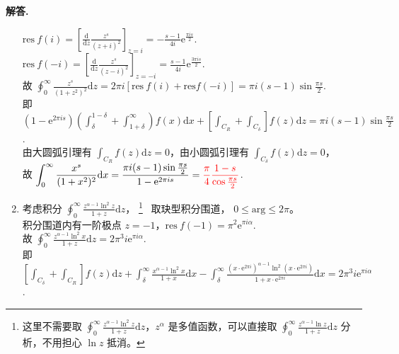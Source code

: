 \documentclass[11pt]{ctexart}
\newenvironment{solution}{\par\noindent\textbf{解答. }}{\par}
\begin{document}
\begin{solution}
\begin{enumerate}[(1)]
              $\displaystyle\text{res}\ f(i) = \left[\frac{\text{d}}{\text{d}z}\frac{z^s}{(z+i)^2}\right]_{z=i} = -\frac{s-1}{4i}\text{e}^{\frac{\pi is}{2}}$.
              $\displaystyle\text{res}\ f(-i) = \left[\frac{\text{d}}{\text{d}z}\frac{z^s}{(z-i)^2}\right]_{z=-i} = \frac{s-1}{4i}\text{e}^{\frac{3\pi is}{2}}$. \\[12pt]
              故 $\displaystyle\oint_{0}^{\infty}\frac{z^s}{(1+z^2)^2}\text{d}z
              = 2\pi i\left[\text{res}\ f(i) + \text{res}f(-i)\right]
              = \pi i(s-1)\sin{\frac{\pi s}{2}}$. \\[12pt]
              即 $\displaystyle\left(1 - \text{e}^{2\pi is}\right)\left(\int_{\delta}^{1-\delta} + \int_{1+\delta}^{\infty}\right)f(x)\text{d}x 
              + \left[\int_{C_R} + \int_{C_{\delta}}\right]f(z)\text{d}z = \pi i(s-1)\sin{\frac{\pi s}{2}}$. \\[12pt]
              由大圆弧引理有 $\displaystyle\int_{C_R}f(z)\text{d}z = 0$，由小圆弧引理有 $\displaystyle\int_{C_\delta}f(z)\text{d}z = 0$， \\[12pt]
              故 $\displaystyle\int_{0}^{\infty}\frac{x^{s}}{(1+x^2)^2}\text{d}x
              = \frac{\pi i(s-1)\sin{\frac{\pi s}{2}}}{1 - \text{e}^{2\pi is}} = \textcolor{red}{\frac{\pi}{4}\frac{1-s}{\cos{\frac{\pi s}{2}}}}$.
        \item 考虑积分 $\displaystyle\oint_{0}^{\infty}\frac{z^{\alpha-1}\ln^2{z}}{1+z}\text{d}z$，\textcolor{red}{\XSolid}
              \footnote[1]{这里不需要取 $\displaystyle\oint_{0}^{\infty}\frac{z^{\alpha-1}\ln^2{z}}{1+z}\text{d}z$，$z^\alpha$ 是多值函数，可以直接取 $\displaystyle\oint_{0}^{\infty}\frac{z^{\alpha-1}\ln{z}}{1+z}\text{d}z$ 分析，不用担心 $\ln{z}$ 抵消。} \ 
              取玦型积分围道， $0\leq\text{arg}\leq2\pi$。 \\[12pt]
              积分围道内有一阶极点 $z = -1$，$\text{res}\ f(-1) = \pi^2\text{e}^{\pi i\alpha}$. \\[12pt]
              故 $\displaystyle\oint_{0}^{\infty}\frac{z^{\alpha-1}\ln^2{x}}{1+z}\text{d}z
              = 2\pi^3 i\text{e}^{\pi i\alpha}$. \\[12pt]
              即 $\displaystyle\left[\int_{C_\delta} + \int_{C_R}\right]f(z)\text{d}{z}
              + \int_{\delta}^{\infty}\frac{x^{\alpha-1}\ln^2{x}}{1+x}\text{d}x 
              - \int_{\delta}^{\infty}\frac{(x\cdot\text{e}^{2\pi i})^{\alpha-1}\ln^2{\left(x\cdot\text{e}^{2\pi i}\right)}}{1+x\cdot\text{e}^{2\pi i}}\text{d}x
              = 2\pi^3 i\text{e}^{\pi i\alpha}$. \\[12pt]

\end{enumerate}
\end{solution}
\end{document}
